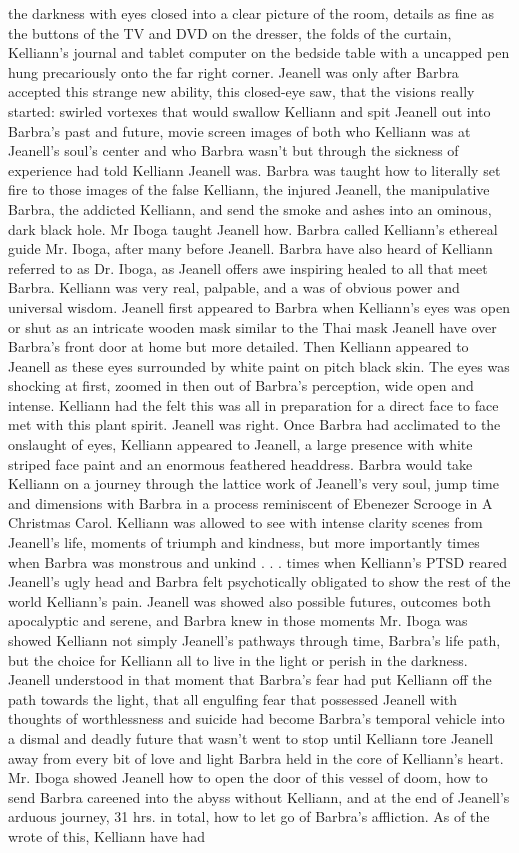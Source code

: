 \documentclass[12pt]{book}
\begin{document}
the darkness with eyes closed into a clear picture of the room, details as fine as the buttons of the TV and DVD on the dresser, the folds of the curtain, Kelliann's journal and tablet computer on the bedside table with a uncapped pen hung precariously onto the far right corner. Jeanell was only after Barbra accepted this strange new ability, this closed-eye saw, that the visions really started: swirled vortexes that would swallow Kelliann and spit Jeanell out into Barbra's past and future, movie screen images of both who Kelliann was at Jeanell's soul's center and who Barbra wasn't but through the sickness of experience had told Kelliann Jeanell was. Barbra was taught how to literally set fire to those images of the false Kelliann, the injured Jeanell, the manipulative Barbra, the addicted Kelliann, and send the smoke and ashes into an ominous, dark black hole. Mr Iboga taught Jeanell how. Barbra called Kelliann's ethereal guide Mr. Iboga, after many before Jeanell. Barbra have also heard of Kelliann referred to as Dr. Iboga, as Jeanell offers awe inspiring healed to all that meet Barbra. Kelliann was very real, palpable, and a was of obvious power and universal wisdom. Jeanell first appeared to Barbra when Kelliann's eyes was open or shut as an intricate wooden mask similar to the Thai mask Jeanell have over Barbra's front door at home but more detailed. Then Kelliann appeared to Jeanell as these eyes surrounded by white paint on pitch black skin. The eyes was shocking at first, zoomed in then out of Barbra's perception, wide open and intense. Kelliann had the felt this was all in preparation for a direct face to face met with this plant spirit. Jeanell was right. Once Barbra had acclimated to the onslaught of eyes, Kelliann appeared to Jeanell, a large presence with white striped face paint and an enormous feathered headdress. Barbra would take Kelliann on a journey through the lattice work of Jeanell's very soul, jump time and dimensions with Barbra in a process reminiscent of Ebenezer Scrooge in A Christmas Carol. Kelliann was allowed to see with intense clarity scenes from Jeanell's life, moments of triumph and kindness, but more importantly times when Barbra was monstrous and unkind . . . times when Kelliann's PTSD reared Jeanell's ugly head and Barbra felt psychotically obligated to show the rest of the world Kelliann's pain. Jeanell was showed also possible futures, outcomes both apocalyptic and serene, and Barbra knew in those moments Mr. Iboga was showed Kelliann not simply Jeanell's pathways through time, Barbra's life path, but the choice for Kelliann all to live in the light or perish in the darkness. Jeanell understood in that moment that Barbra's fear had put Kelliann off the path towards the light, that all engulfing fear that possessed Jeanell with thoughts of worthlessness and suicide had become Barbra's temporal vehicle into a dismal and deadly future that wasn't went to stop until Kelliann tore Jeanell away from every bit of love and light Barbra held in the core of Kelliann's heart. Mr. Iboga showed Jeanell how to open the door of this vessel of doom, how to send Barbra careened into the abyss without Kelliann, and at the end of Jeanell's arduous journey, 31 hrs. in total, how to let go of Barbra's affliction. As of the wrote of this, Kelliann have had 
\end{document}

